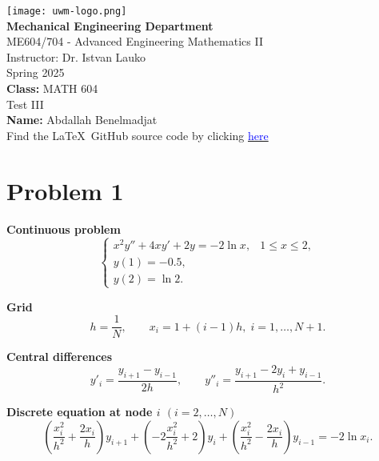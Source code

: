 \documentclass{article}
\begin{document}
\date{}

\begin{titlepage}
    \centering
    \texttt{[image: uwm-logo.png]} \\[1cm]
    
    {\Large \textbf{Mechanical Engineering Department}}\\[0.5em]
    {\large ME604/704 - Advanced Engineering Mathematics II}\\[0.5em]
    {\large Instructor: Dr. Istvan Lauko}\\[0.5em]
    {\large Spring 2025}\\[2cm]
    
    {\large \textbf{Class:} MATH 604}\\[0.5em]
    {\large \textbf{} Test III}\\[0.5em]
    {\large \textbf{Name:} Abdallah Benelmadjat}\\[0.5em]
    {\large Find the \LaTeX\ GitHub source code by clicking \href{https://github.com/abdallah-benelmadjat/MATH-602/blob/main/HW4.tex}{\textcolor{blue}{here}}}\\
\end{titlepage}

\newpage

\section*{Problem 1}

\vspace{0.5em}
\textbf{Continuous problem}
\[
\begin{cases}
x^{2}y''+4xy'+2y=-2\ln x, & 1\le x\le 2,\\
y(1)=-0.5,\\
y(2)=\ln 2.
\end{cases}
\]

\textbf{Grid}
\[
h=\dfrac{1}{N}, 
\qquad
x_i=1+(i-1)h,\; i=1,\dots,N+1.
\]

\textbf{Central differences}
\[
y'_i=\dfrac{y_{i+1}-y_{i-1}}{2h},
\qquad
y''_i=\dfrac{y_{i+1}-2y_i+y_{i-1}}{h^{2}}.
\]

\textbf{Discrete equation at node \(i\) \((i=2,\dots,N)\)}
\[
\left(\frac{x_i^{2}}{h^{2}}+\frac{2x_i}{h}\right)y_{i+1}
+\left(-2\frac{x_i^{2}}{h^{2}}+2\right)y_{i}
+\left(\frac{x_i^{2}}{h^{2}}-\frac{2x_i}{h}\right)y_{i-1}
=-2\ln x_i.
\]
\end{document}
